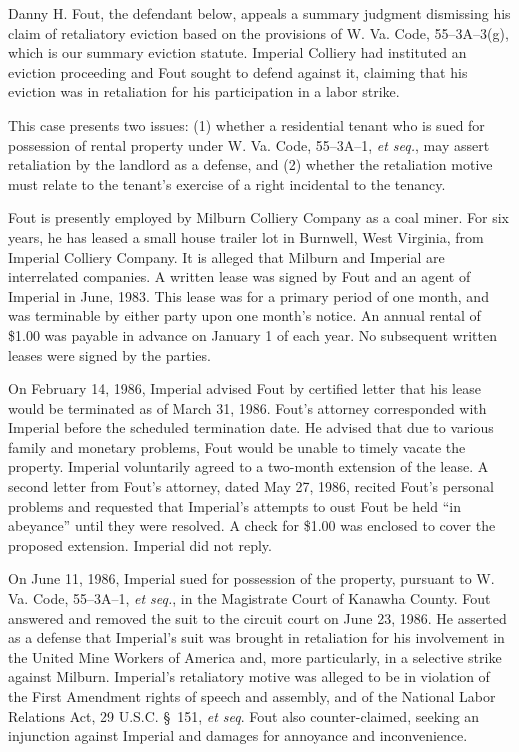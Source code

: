 
Danny H. Fout, the defendant below, appeals a summary judgment dismissing his
claim of retaliatory eviction based on the provisions of W. Va. Code,
55--3A--3(g), which is our summary eviction statute. Imperial Colliery had
instituted an eviction proceeding and Fout sought to defend against it,
claiming that his eviction was in retaliation for his participation in a labor
strike.

This case presents two issues: (1) whether a residential tenant who is sued for
possession of rental property under W. Va. Code, 55--3A--1, \textit{et seq.},
may
assert retaliation by the landlord as a defense, and (2) whether the
retaliation motive must relate to the tenant's exercise of a right incidental
to the tenancy.

Fout is presently employed by Milburn Colliery Company as a coal miner. For six
years, he has leased a small house trailer lot in Burnwell, West Virginia, from
Imperial Colliery Company. It is alleged that Milburn and Imperial are
interrelated companies. A written lease was signed by Fout and an agent of
Imperial in June, 1983. This lease was for a primary period of one month, and
was terminable by either party upon one month's notice. An annual rental of
\$1.00 was payable in advance on January 1 of each year. No subsequent written
leases were signed by the parties.

On February 14, 1986, Imperial advised Fout by certified letter that his lease
would be terminated as of March 31, 1986. Fout's attorney corresponded with
Imperial before the scheduled termination date. He advised that due to various
family and monetary problems, Fout would be unable to timely vacate the
property. Imperial voluntarily agreed to a two-month extension of the lease. A
second letter from Fout's attorney, dated May 27, 1986, recited Fout's personal
problems and requested that Imperial's attempts to oust Fout be held ``in
abeyance'' until they were resolved. A check for \$1.00 was enclosed to cover
the proposed extension. Imperial did not reply.

On June 11, 1986, Imperial sued for possession of the property, pursuant to
W. Va. Code, 55--3A--1, \textit{et seq.}, in the Magistrate Court of Kanawha
County. Fout answered and removed the suit to the circuit court on June 23,
1986. He asserted as a defense that Imperial's suit was brought in retaliation
for his involvement in the United Mine Workers of America and, more
particularly, in a selective strike against Milburn. Imperial's retaliatory
motive was alleged to be in violation of the First Amendment rights of speech
and assembly, and of the National Labor Relations Act, 29 U.S.C. \S~151,
\textit{et seq}. Fout also counter-claimed, seeking an injunction against
Imperial and damages for annoyance and inconvenience.

